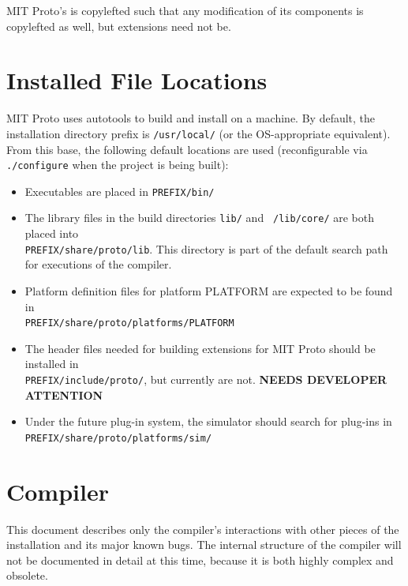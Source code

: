 \documentclass{article}
\newcommand\fixme{{\bf NEEDS DEVELOPER ATTENTION}}
\begin{document}
MIT Proto's is copylefted such that any modification of its components
is copylefted as well, but extensions need not be.

\section{Installed File Locations}

MIT Proto uses autotools to build and install on a machine.  By
default, the installation directory prefix is {\tt /usr/local/} (or
the OS-appropriate equivalent).  From this base, the following default
locations are used (reconfigurable via {\tt ./configure} when the project
is being built):

\begin{itemize}
\item Executables are placed in {\tt PREFIX/bin/}
\item The library files in the build directories {\tt lib/} and {\tt
    /lib/core/} are both placed into \\{\tt PREFIX/share/proto/lib}.
  This directory is part of the default search path for executions of
  the compiler.
\item Platform definition files for platform PLATFORM are expected 
  to be found in \\{\tt PREFIX/share/proto/platforms/PLATFORM}
\item The header files needed for building extensions for MIT Proto
  should be installed in \\{\tt PREFIX/include/proto/}, but currently
  are not. \fixme
\item Under the future plug-in system, the simulator should search for
  plug-ins in \\{\tt PREFIX/share/proto/platforms/sim/}
\end{itemize}

\section{Compiler}

This document describes only the compiler's interactions with other
pieces of the installation and its major known bugs.  The internal
structure of the compiler will not be documented in detail at this
time, because it is both highly complex and obsolete.
\end{document}
